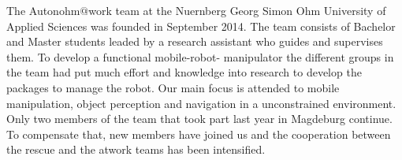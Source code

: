 The Autonohm$@$work team at the Nuernberg Georg Simon Ohm University of Applied Sciences
was founded in September 2014. The team consists of Bachelor and Master students leaded by a
research assistant who guides and supervises them. To develop a functional mobile-robot-
manipulator the different groups in the team had put much effort and knowledge into research to
develop the packages to manage the robot. Our main focus is attended to mobile manipulation,
object perception and navigation in a unconstrained environment. 
Only two members of the team that took part last year in Magdeburg continue. To compensate that,
new members have joined us and the cooperation between the rescue and the atwork teams has been
intensified.
